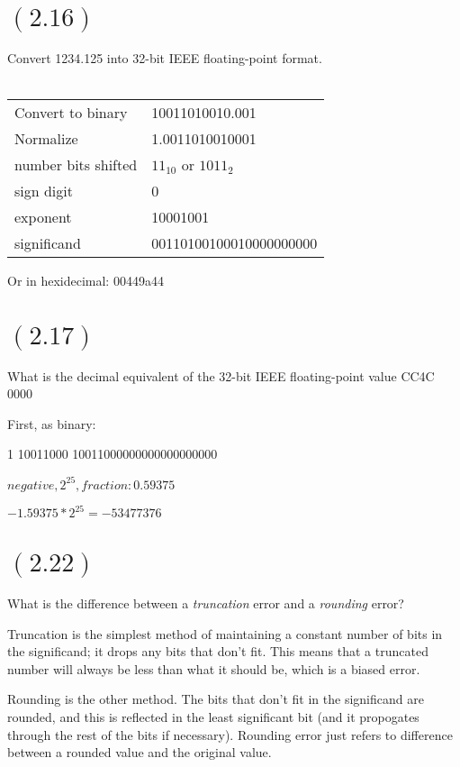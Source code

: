 \documentclass[letterpaper,12pt,titlepage]{article}
\begin{document}
\newpage
\section*{$(2.16)$} 
Convert 1234.125 into 32-bit IEEE floating-point format.\\ 
\\
\begin{center}
\begin{tabular}{l | l}
Convert to binary		& 10011010010.001 		\\
Normalize 				& 1.0011010010001 		\\
number bits shifted		& $11_10$ or $1011_2$ 	\\
\hline	\hline
sign digit 				& 0 \\
exponent 				& 10001001 \\
significand 			& 00110100100010000000000 \\
\end{tabular}
\end{center}

Or in hexidecimal: 00449a44 

\section*{$(2.17)$} What is the decimal equivalent of the 32-bit IEEE floating-point value CC4C 0000
  
First, as binary:

1 10011000 10011000000000000000000

$ negative, 2^{25}, fraction: 0.59375 $ 

$ -1.59375 * 2^{25} = -53477376 $

\section*{$(2.22)$} What is the difference between a \textit{truncation} error and a \textit{rounding} error? 
  
Truncation is the simplest method of maintaining a constant number of bits in the significand; it drops any bits that don't fit. This means that a truncated number will always be less than what it should be, which is a biased error.

Rounding is the other method. The bits that don't fit in the significand are rounded, and this is reflected in the least significant bit (and it propogates through the rest of the bits if necessary). Rounding error just refers to difference between a rounded value and the original value.
\end{document}
